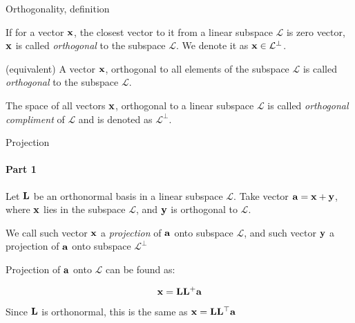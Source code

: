 \documentclass{beamer}
\begin{document}
\begin{frame}{Orthogonality, definition}
\begin{flushleft}

\begin{definition}
If for a vector $\mathbf{x}$, the closest vector to it from a linear subspace $\mathcal{L}$ is zero vector, $\mathbf{x}$ is called \emph{orthogonal} to the subspace $\mathcal{L}$. We denote it as $\mathbf{x} \in \mathcal{L}^\perp$.
\end{definition}

\begin{definition}
	(equivalent) A vector $\mathbf{x}$, orthogonal to all elements of the subspace $\mathcal{L}$ is called \emph{orthogonal} to the subspace $\mathcal{L}$.
\end{definition}

\begin{definition}
The space of all vectors $\mathbf{x}$, orthogonal to a linear subspace $\mathcal{L}$ is called \emph{orthogonal compliment} of $\mathcal{L}$ and is denoted as $\mathcal{L}^\perp$.
\end{definition}

\end{flushleft}
\end{frame}





\begin{frame}{Projection}
\framesubtitle{Part 1}
\begin{flushleft}

Let $\mathbf{L}$ be an orthonormal basis in a linear subspace $\mathcal{L}$. Take vector $\mathbf{a} = \mathbf{x} + \mathbf{y}$, where $\mathbf{x}$ lies in the subspace $\mathcal{L}$, and $\mathbf{y}$ is orthogonal to $\mathcal{L}$.

\bigskip

\begin{definition}
We call such vector $\mathbf{x}$ a \emph{projection} of $\mathbf{a}$ onto subspace $\mathcal{L}$, and such vector $\mathbf{y}$ a projection of $\mathbf{a}$ onto subspace $\mathcal{L}^\perp$
\end{definition}

\bigskip

Projection of $\mathbf{a}$ onto $\mathcal{L}$ can be found as: 

\begin{equation}
    \mathbf{x} = \mathbf{L} \mathbf{L}^+ \mathbf{a}
\end{equation}

Since $\mathbf{L}$ is orthonormal, this is the same as $\mathbf{x} = \mathbf{L} \mathbf{L}^\top \mathbf{a}$

\end{flushleft}
\end{frame}
\end{document}

